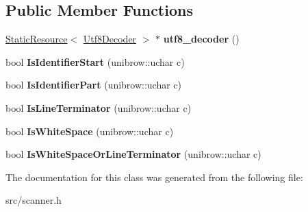 \subsection*{Public Member Functions}
\begin{DoxyCompactItemize}
\item 
\hypertarget{classv8_1_1internal_1_1_unicode_cache_a7cb5b1e10aabf0f2cfeb19ea98d21ef5}{}\hyperlink{classv8_1_1internal_1_1_static_resource}{Static\+Resource}$<$ \hyperlink{classunibrow_1_1_utf8_decoder}{Utf8\+Decoder} $>$ $\ast$ {\bfseries utf8\+\_\+decoder} ()\label{classv8_1_1internal_1_1_unicode_cache_a7cb5b1e10aabf0f2cfeb19ea98d21ef5}

\item 
\hypertarget{classv8_1_1internal_1_1_unicode_cache_a63de14e7920c22f85edaa4b09184d110}{}bool {\bfseries Is\+Identifier\+Start} (unibrow\+::uchar c)\label{classv8_1_1internal_1_1_unicode_cache_a63de14e7920c22f85edaa4b09184d110}

\item 
\hypertarget{classv8_1_1internal_1_1_unicode_cache_a13c172d7080d40693cb3a130cad8d599}{}bool {\bfseries Is\+Identifier\+Part} (unibrow\+::uchar c)\label{classv8_1_1internal_1_1_unicode_cache_a13c172d7080d40693cb3a130cad8d599}

\item 
\hypertarget{classv8_1_1internal_1_1_unicode_cache_a3c47629a8b6d7eb07c0b30466ec4f62a}{}bool {\bfseries Is\+Line\+Terminator} (unibrow\+::uchar c)\label{classv8_1_1internal_1_1_unicode_cache_a3c47629a8b6d7eb07c0b30466ec4f62a}

\item 
\hypertarget{classv8_1_1internal_1_1_unicode_cache_a4571602ee6cc8f874da96783d33020c3}{}bool {\bfseries Is\+White\+Space} (unibrow\+::uchar c)\label{classv8_1_1internal_1_1_unicode_cache_a4571602ee6cc8f874da96783d33020c3}

\item 
\hypertarget{classv8_1_1internal_1_1_unicode_cache_a4d39d01fa0f8c958d9e1112a345a3ad0}{}bool {\bfseries Is\+White\+Space\+Or\+Line\+Terminator} (unibrow\+::uchar c)\label{classv8_1_1internal_1_1_unicode_cache_a4d39d01fa0f8c958d9e1112a345a3ad0}

\end{DoxyCompactItemize}


The documentation for this class was generated from the following file\+:\begin{DoxyCompactItemize}
\item 
src/scanner.\+h\end{DoxyCompactItemize}
